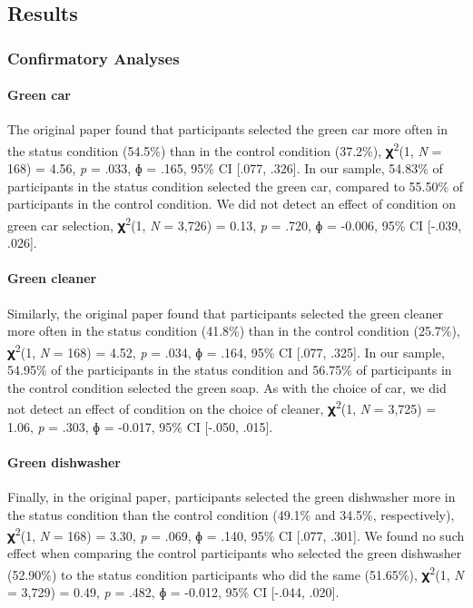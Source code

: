 \documentclass[
]{article}
\begin{document}
\subsection{Results}\label{results}

\subsubsection{Confirmatory Analyses}\label{confirmatory-analyses}

\paragraph{Green car}\label{green-car}

The original paper found that participants selected the green car more
often in the status condition (54.5\%) than in the control condition
(37.2\%), 𝛘\textsuperscript{2}(1, \emph{N} = 168) = 4.56, \emph{p} =
.033, ɸ = .165, 95\% CI {[}.077, .326{]}. In our sample, 54.83\% of
participants in the status condition selected the green car, compared to
55.50\% of participants in the control condition. We did not detect an
effect of condition on green car selection, 𝛘\textsuperscript{2}(1,
\emph{N} = 3,726) = 0.13, \emph{p} = .720, ɸ = -0.006, 95\% CI {[}-.039,
.026{]}.

\paragraph{Green cleaner}\label{green-cleaner}

Similarly, the original paper found that participants selected the green
cleaner more often in the status condition (41.8\%) than in the control
condition (25.7\%), 𝛘\textsuperscript{2}(1, \emph{N} = 168) = 4.52,
\emph{p} = .034, ɸ = .164, 95\% CI {[}.077, .325{]}. In our sample,
54.95\% of the participants in the status condition and 56.75\% of
participants in the control condition selected the green soap. As with
the choice of car, we did not detect an effect of condition on the
choice of cleaner, 𝛘\textsuperscript{2}(1, \emph{N} = 3,725) = 1.06,
\emph{p} = .303, ɸ = -0.017, 95\% CI {[}-.050, .015{]}.

\paragraph{Green dishwasher}\label{green-dishwasher}

Finally, in the original paper, participants selected the green
dishwasher more in the status condition than the control condition
(49.1\% and 34.5\%, respectively), 𝛘\textsuperscript{2}(1, \emph{N} =
168) = 3.30, \emph{p} = .069, ɸ = .140, 95\% CI {[}.077, .301{]}. We
found no such effect when comparing the control participants who
selected the green dishwasher (52.90\%) to the status condition
participants who did the same (51.65\%), 𝛘\textsuperscript{2}(1,
\emph{N} = 3,729) = 0.49, \emph{p} = .482, ɸ = -0.012, 95\% CI {[}-.044,
.020{]}.
\end{document}
